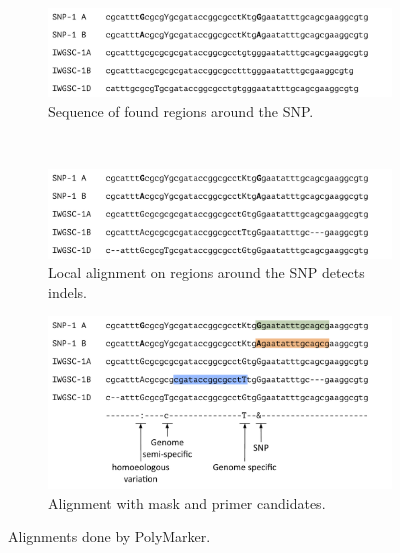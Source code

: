 \begin{figure}
    \begin{subfigure}[b]{0.4\textwidth}
        \includegraphics[width=1\textwidth]{PolyMarker/Figures/aln/scaffoldsFound.pdf}
        \caption{Sequence of found regions around the SNP.}
        \label{fig:poly:globalSequence}
    \end{subfigure}
    ~ %
    \begin{subfigure}[b]{0.4\textwidth}
        \includegraphics[width=1\textwidth]{PolyMarker/Figures/aln/localAlignment.pdf} 
        \caption{Local alignment on regions around the SNP detects indels.}
        \label{fig:poly:localSequence}
    \end{subfigure}

    \begin{subfigure}[b]{0.8\textwidth}
        \includegraphics[width=1\textwidth]{PolyMarker/Figures/aln/mask.pdf} 
        \caption{Alignment with mask and primer candidates.}
        \label{fig:poly:mask}
    \end{subfigure}
    \caption{Alignments done by PolyMarker.}\label{fig:global}
\end{figure}


